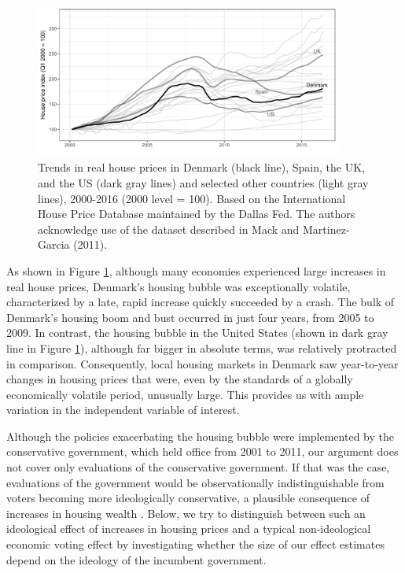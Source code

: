 \documentclass[12pt,a4paper]{article}
\begin{document}
	
	
	\begin{figure}[htbp!]
		\includegraphics[width=0.9\textwidth]{../figures/timeplot}
		\centering
		\caption{Trends in real house prices in Denmark (black line), Spain, the UK, and the US (dark gray lines) and selected other countries (light gray lines), 2000-2016 (2000 level = 100). Based on the International House Price Database maintained by the Dallas Fed. The authors acknowledge use of the dataset described in Mack and Martinez-Garcia (2011).}\label{hpd}
	\end{figure}
	
	As shown in Figure \ref{hpd}, although many economies experienced large increases in real house prices, Denmark's housing bubble was exceptionally volatile, characterized by a late, rapid increase quickly succeeded by a crash. The bulk of Denmark's housing boom and bust occurred in just four years, from 2005 to 2009. In contrast, the housing bubble in the United States (shown in dark gray line in Figure \ref{hpd}), although far bigger in absolute terms, was relatively protracted in comparison. Consequently, local housing markets in Denmark saw year-to-year changes in housing prices that were, even by the standards of a globally economically volatile period, unusually large. This provides us with ample variation in the independent variable of interest.
	
	
	Although the policies exacerbating the housing bubble were implemented by the conservative government, which held office from 2001 to 2011, our argument does not cover only evaluations of the conservative government.  If that was the case, evaluations of the government would be observationally indistinguishable from voters becoming more ideologically conservative, a plausible consequence of increases in housing wealth \citep{ ansell2014political}. Below, we try to distinguish between such an ideological effect of increases in housing prices and a typical non-ideological economic voting effect by investigating whether the size of our effect estimates depend on the ideology of the incumbent government. 
	
\end{document}
